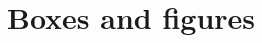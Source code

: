 \documentclass[12pt]{article}
\begin{document}
\begin{spacing}{2.0}
\end{spacing}

\section*{Boxes and figures}
\end{document}
